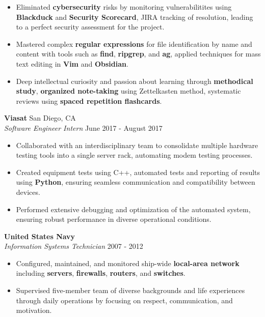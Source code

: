 \documentclass[a4paper]{article}
\begin{document}
\begin{itemize}
	\item Eliminated \textbf{cybersecurity} risks by monitoring vulnerabilitites using \textbf{Blackduck} and \textbf{Security Scorecard}, JIRA tracking of resolution, leading to a perfect security assessment for the project.
	\item Mastered complex \textbf{regular expressions} for file identification by name and content with tools such as \textbf{find}, \textbf{ripgrep}, and \textbf{ag}, applied techniques for mass text editing in \textbf{Vim} and \textbf{Obsidian}.
	\item Deep intellectual curiosity and passion about learning through \textbf{methodical study}, \textbf{organized note-taking} using Zettelkasten method, systematic reviews using \textbf{spaced repetition flashcards}.
\end{itemize}

\vspace{-1mm}
\textbf{Viasat} \hfill San Diego, CA\\
\textit{Software Engineer Intern} \hfill June 2017 - August 2017\\
\vspace{-1mm}
\begin{itemize} \itemsep 1pt
    \item Collaborated with an interdisciplinary team to consolidate multiple hardware testing tools into a single server rack, automating modem testing processes.
    \item Created equipment tests using C++, automated tests and reporting of results using \textbf{Python}, ensuring seamless communication and compatibility between devices.
    \item Performed extensive debugging and optimization of the automated system, ensuring robust performance in diverse operational conditions.
\end{itemize}

\textbf{United States Navy} \hfill \\
\textit{Information Systems Technician} \hfill 2007 - 2012\\
\vspace{-1mm}
\begin{itemize} \itemsep 1pt
	\item Configured, maintained, and monitored ship-wide \textbf{local-area network} including \textbf{servers}, \textbf{firewalls}, \textbf{routers}, and \textbf{switches}.
	\item Supervised five-member team of diverse backgrounds and life experiences through daily operations by focusing on respect, communication, and motivation.
\end{itemize}
\end{document}
